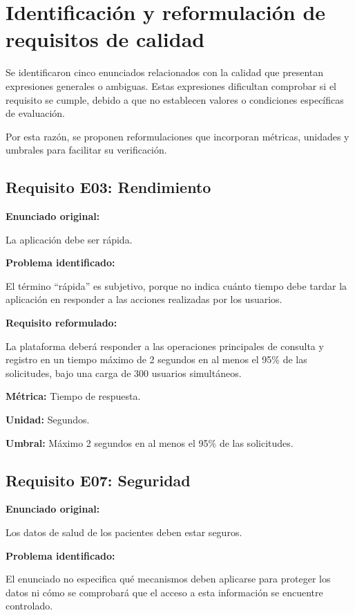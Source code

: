 \documentclass[12pt,a4paper]{article}
\begin{document}
\section{Identificación y reformulación de requisitos de calidad}

Se identificaron cinco enunciados relacionados con la
calidad que presentan expresiones generales o ambiguas.
Estas expresiones dificultan comprobar si el requisito
se cumple, debido a que no establecen valores o condiciones
específicas de evaluación.

Por esta razón, se proponen reformulaciones que incorporan
métricas, unidades y umbrales para facilitar su verificación.

\subsection{Requisito E03: Rendimiento}

\textbf{Enunciado original:}

La aplicación debe ser rápida.

\textbf{Problema identificado:}

El término ``rápida'' es subjetivo, porque no indica cuánto
tiempo debe tardar la aplicación en responder a las acciones
realizadas por los usuarios.

\textbf{Requisito reformulado:}

La plataforma deberá responder a las operaciones principales
de consulta y registro en un tiempo máximo de 2 segundos
en al menos el 95\% de las solicitudes, bajo una carga de
300 usuarios simultáneos.

\textbf{Métrica:} Tiempo de respuesta.

\textbf{Unidad:} Segundos.

\textbf{Umbral:} Máximo 2 segundos en al menos el 95\%
de las solicitudes.

\subsection{Requisito E07: Seguridad}

\textbf{Enunciado original:}

Los datos de salud de los pacientes deben estar seguros.

\textbf{Problema identificado:}

El enunciado no especifica qué mecanismos deben aplicarse
para proteger los datos ni cómo se comprobará que el acceso
a esta información se encuentre controlado.
\end{document}
